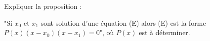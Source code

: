 
Expliquer la proposition :

"Si $x_0$ et $x_1$ sont solution d'une équation (E) alors  (E) est la forme $P(x)(x-x_0)(x-x_1)=0$", où $P(x)$ est à déterminer.